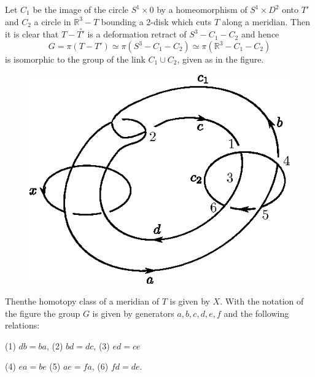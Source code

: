 Let $C_1$ be the image of the circle $S^1 \times 0$ by a homeomorphism
of $S^1 \times D^2$ onto $T'$ and $C_2$ a circle in $\mathbb{R}^3 - T$
bounding a 2-disk which cuts $T$ along a meridian. Then it is clear
that $T - \overset{\circ}{T'}$ is a deformation retract of $S^3 - C_1 -
C_2$ and hence  
$$
G = \pi (T - T') \simeq \pi (S^3 - C_1 - C_2) \simeq \pi (\mathbb{R}^3
- C_1- C_2) 
$$
is isomorphic to the group of the link $C_1 \cup C_2$, given as in the
figure. 
\begin{figure}[H]
\centering
\includegraphics{vol44-fig/fig44-14.eps}
\end{figure}


Then\pageoriginale the homotopy class of a meridian of $T$ is given by
$X$. With the notation of the figure the group $G$ is given by
generators $a, b, c, d, e, f$ and the following relations:

\smallskip
\noindent
(1) $db = ba$, \quad  (2) $bd = dc$, \quad (3) $ed = ce$

\noindent
(4) $ea = be $  \quad (5) $ae = fa$, \quad  (6) $fd = de$.
\smallskip

